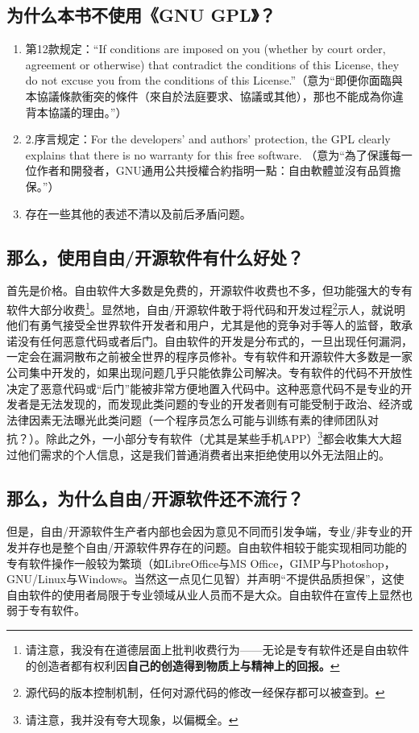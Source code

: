 \subsection{为什么本书不使用《GNU GPL》？}
\begin{enumerate}
	\item 第12款规定：“If conditions are imposed on you (whether by court order, agreement or otherwise) that contradict the conditions of this License, they do not excuse you from the conditions of this License.”（意为“即便你面臨與本協議條款衝突的條件（來自於法庭要求、協議或其他），那也不能成為你違背本協議的理由。”）
	\item 2.序言规定：For the developers' and authors' protection, the GPL clearly explains that there is no warranty for this free software. （意为“為了保護每一位作者和開發者，GNU通用公共授權合約指明一點：自由軟體並沒有品質擔保。”）
	\item 存在一些其他的表述不清以及前后矛盾问题。
\end{enumerate}
\subsection{那么，使用自由/开源软件有什么好处？}
首先是价格。自由软件大多数是免费的，开源软件收费也不多，但功能强大的专有软件大部分收费\footnote{请注意，我没有在道德层面上批判收费行为——无论是专有软件还是自由软件的创造者都有权利因\bf 自己的\normalall 创造得到物质上与精神上的回报。}。显然地，自由/开源软件敢于将代码和开发过程\footnote{源代码的版本控制机制，任何对源代码的修改一经保存都可以被查到。}示人，就说明他们有勇气接受全世界软件开发者和用户，尤其是他的竞争对手等人的监督，敢承诺没有任何恶意代码或者后门。自由软件的开发是分布式的，一旦出现任何漏洞，一定会在漏洞散布之前被全世界的程序员修补。专有软件和开源软件大多数是一家公司集中开发的，如果出现问题几乎只能依靠公司解决。专有软件的代码不开放性决定了恶意代码或“后门”能被非常方便地置入代码中。这种恶意代码不是专业的开发者是无法发现的，而发现此类问题的专业的开发者则有可能受制于政治、经济或法律因素无法曝光此类问题（一个程序员怎么可能与训练有素的律师团队对抗？）。除此之外，一小部分专有软件（尤其是某些手机APP）\footnote{请注意，我并没有夸大现象，以偏概全。}都会收集大大超过他们需求的个人信息，这是我们普通消费者出来拒绝使用以外无法阻止的。
\subsection{那么，为什么自由/开源软件还不流行？}
但是，自由/开源软件生产者内部也会因为意见不同而引发争端，专业/非专业的开发并存也是整个自由/开源软件界存在的问题。自由软件相较于能实现相同功能的专有软件操作一般较为繁琐（如LibreOffice与MS Office，GIMP与Photoshop，GNU/Linux与Windows。当然这一点见仁见智）并声明“不提供品质担保”，这使自由软件的使用者局限于专业领域从业人员而不是大众。自由软件在宣传上显然也弱于专有软件。